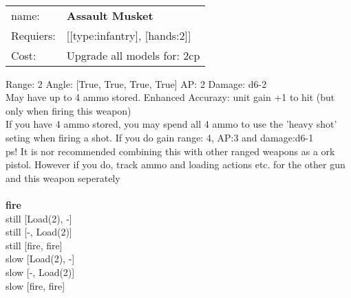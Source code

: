 \ \\
\begin{tabular}{ll}
name: & {\bf Assault Musket } \\
Requiers: & [[type:infantry], [hands:2]] \\
Cost: & Upgrade all models for: 2cp \\
\end{tabular}



Range: 2  Angle: [True, True, True, True] AP: 2 Damage: d6-2 \\
May have up to 4 ammo stored. Enhanced Accurazy: unit gain +1 to hit (but only when firing this weapon)\\ 
If you have 4 ammo stored, you may spend all 4 ammo to use the 'heavy shot' seting when firing a shot. If you do gain range: 4, AP:3 and damage:d6-1\\ 
 ps! It is nor recommended combining this with other ranged weapons as a ork pistol. However if you do, track ammo and loading actions etc. for the other gun and this weapon seperately\\ 







\ \\ {\bf fire } \\
still [Load(2), -] \\
still [-, Load(2)] \\
still [fire, fire] \\
slow [Load(2), -] \\
slow [-, Load(2)] \\
slow [fire, fire] \\

